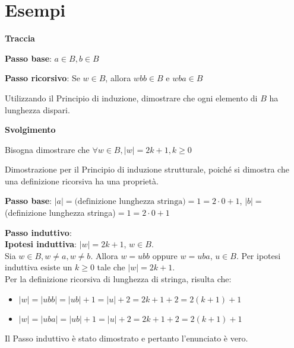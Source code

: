 \section{Esempi}
\begin{example}
\phantom{}
\centerline{\textbf{Traccia}}

\textbf{Passo base}: $a \in B, b \in B$

\textbf{Passo ricorsivo}: Se $w \in B$, allora $wbb \in B$ e $wba \in B$

Utilizzando il Principio di induzione, dimostrare che ogni elemento di $B$ ha lunghezza dispari.

\centerline{\textbf{Svolgimento}}

Bisogna dimostrare che $\forall w \in B, |w| = 2k+1, k \ge 0$

Dimostrazione per il Principio di induzione strutturale, poiché si dimostra che una definizione ricorsiva ha una proprietà.

\textbf{Passo base}: $|a| =\text{(definizione lunghezza stringa)}=1 = 2 \cdot 0 + 1$, $|b| =$(definizione lunghezza stringa)$=1 = 2 \cdot 0 + 1$

\textbf{Passo induttivo}: \\
\textbf{Ipotesi induttiva}: $|w| = 2k + 1$, $w \in B$. \\
Sia $w \in B, w \neq a, w \neq b$. Allora $w = ubb$ oppure $w = uba$, $u \in B$.
Per ipotesi induttiva esiste un $k \ge 0$ tale che $|w| = 2k + 1$. \\
Per la definizione ricorsiva di lunghezza di stringa, risulta che:
\begin{itemize}
    \item $|w| = |ubb| = |ub| + 1 = |u| + 2 = 2k + 1 + 2 = 2(k + 1) + 1$
    \item $|w| = |uba| = |ub| + 1 = |u| + 2 = 2k + 1 + 2 = 2(k + 1) + 1$
\end{itemize}

Il Passo induttivo è stato dimostrato e pertanto l'enunciato è vero.
\end{example}

